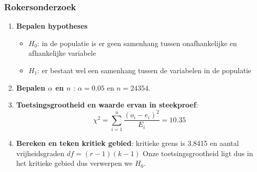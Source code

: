 \documentclass{beamer}
\begin{document}
\begin{frame}
  \frametitle{Rokersonderzoek}
  \begin{enumerate}
  \item \textbf{Bepalen hypotheses}
    \begin{itemize}
      \item $H_{0}$: in de populatie is er geen samenhang tussen onafhankelijke en afhankelijke variabele
      \item $H_{1}$: er bestaat wel een samenhang tussen de variabelen in de populatie
    \end{itemize}
  \item \textbf{Bepalen $\alpha$ en $n$} : $\alpha = 0.05$ en $n = 24354$.
  \item \textbf{Toetsingsgrootheid en waarde ervan in steekproef}:
  \[ \chi^{2} = \sum_{i=1}^{n} \frac{(o_{i} - e_{i})^{2}}{E_{i}} = 10.35 \]
  \item \textbf{Bereken en teken kritiek gebied}:  kritieke grens is 3.8415 en aantal vrijheidsgraden $df = (r-1)(k-1)$ Onze toetsingsgrootheid ligt dus in het kritieke gebied dus verwerpen we $H_{0}$.
\end{enumerate}
\end{frame}
\end{document}
